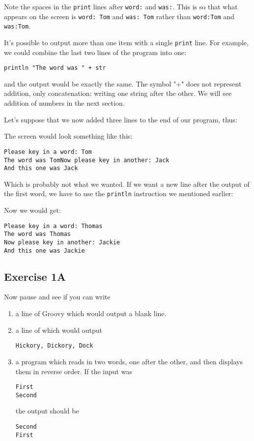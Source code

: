 Note the spaces in the \verb!print! lines after \verb!word:! and \verb!was:!.
This is so that what appears on the screen is \verb!word: Tom! and
\verb!was: Tom! rather than \verb!word:Tom! and \verb!was:Tom!.

It's possible to output more than one item with a single \verb!print! line.
For example, we could combine the last two lines of the program into one:

\begin{Verbatim}
println "The word was " + str
\end{Verbatim}

and the output would be exactly the same. The symbol "+" does not
represent addition, only concatenation: writing one string after the
other. We will see addition of numbers in the next section.

Let's suppose that we now added three lines to the end of our program, thus:


The screen would look something like this:
\begin{Verbatim}
Please key in a word: Tom
The word was TomNow please key in another: Jack
And this one was Jack
\end{Verbatim}

Which is probably not what we wanted.  If we want a new line after the
output of the first word, we have to use the \verb!println! instruction we mentioned earlier:


Now we would get:
\begin{Verbatim}
Please key in a word: Thomas
The word was Thomas
Now please key in another: Jackie
And this one was Jackie
\end{Verbatim}


\subsection{Exercise 1A}

Now pause and see if you can write
\begin{enumerate}
\item
a line of Groovy which would output a blank line.
\item
a line of  which would output

\begin{Verbatim}
Hickory, Dickory, Dock
\end{Verbatim}

\item
a program which reads in two words, one after the other, and then displays them
in reverse order. If the input was 

\begin{Verbatim}
First
Second
\end{Verbatim}

the output should be

\begin{Verbatim}
Second
First
\end{Verbatim}

\end{enumerate}

